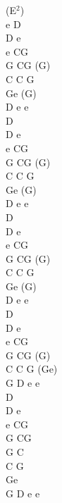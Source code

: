 \documentclass[a5paper, 10pt]{book}
\begin{document}
\begin{minipage}[t]{0.3\textwidth}
  (E$^2$)\\
  e D\\
  D e\\
  e CG\\
  G CG (G)\\
  C C G\\
  Ge (G)\\
  D e e\\

  D\\
  D e\\
  e CG\\
  G CG (G)\\
  C C G\\
  Ge (G)\\
  D e e\\

  D\\
  D e\\
  e CG\\
  G CG (G)\\
  C C G\\
  Ge (G)\\
  D e e\\

  D\\
  D e\\
  e CG\\
  G CG (G)\\
  C C G (Ge)\\
  G D e e\\

  D\\
  D e\\
  e CG\\
  G CG\\
  G C\\
  C G\\
  Ge\\
  G D e e\\
\end{minipage}
\end{document}
